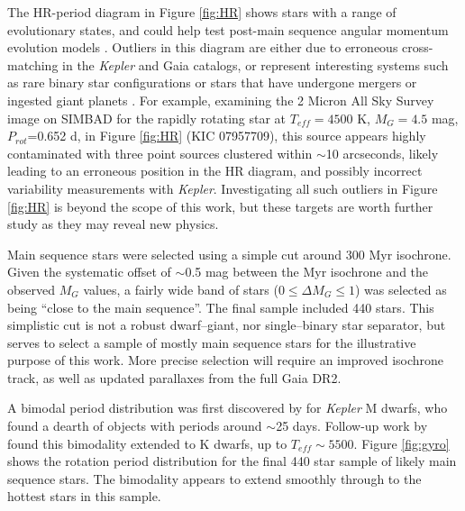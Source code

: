 \documentclass[manuscript, letterpaper]{aastex6}
\makeatletter
\let\origsection\section
\renewcommand\section{\@ifstar{\starsection}{\nostarsection}}
\newcommand\nostarsection[1]{\sectionprelude\origsection{#1}}
\newcommand\starsection[1]{\sectionprelude\origsection*{#1}}
\newcommand\sectionprelude{\vspace{1em}}
\newcommand{\Kepler}{\textsl{Kepler}\xspace}
\makeatother
\begin{document}
The HR-period diagram in Figure \ref{fig:HR} shows stars with a range of evolutionary states, and could help test post-main sequence angular momentum evolution models \citep[e.g.][]{donascimento2012}. Outliers in this diagram are either due to erroneous cross-matching in the \Kepler and Gaia catalogs, or represent interesting systems such as rare binary star configurations or stars that have undergone mergers or ingested giant planets \citep{massarotti2008,tayar2015}. For example, examining the 2 Micron All Sky Survey \citep[2MASS][]{2mass} image on SIMBAD for 
the rapidly rotating star at $T_{eff}=4500$ K, $M_G=4.5$ mag, $P_{rot}$=0.652 d, in Figure \ref{fig:HR} (KIC 07957709), this source appears highly contaminated with three point sources clustered within $\sim$10 arcseconds, likely leading to an erroneous position in the HR diagram, and possibly incorrect variability measurements with \Kepler.
Investigating all such outliers in Figure \ref{fig:HR} is beyond the scope of this work, but these targets are worth further study as they may reveal new physics.



Main sequence stars were selected using a simple cut around 300 Myr isochrone. Given the systematic offset of $\sim$0.5 mag between the Myr isochrone and the observed $M_G$ values, a fairly wide band of stars ($0\le \Delta M_G \le 1$) was selected as being ``close to the main sequence''. The final sample included 440 stars. This simplistic cut is not a robust dwarf--giant, nor single--binary star separator, but serves to select a sample of mostly main sequence stars for the illustrative purpose of this work. More precise selection will require an improved isochrone track, as well as updated parallaxes from the full Gaia DR2.







\section{Extending the Spin-Down Gap}
A bimodal period distribution was first discovered by \citet{mcquillan2013} for \Kepler M dwarfs, who found a dearth of objects with periods around $\sim$25 days. Follow-up work by \citet{mcquillan2014} found this bimodality extended to K dwarfs, up to $T_{eff}\sim5500$. Figure \ref{fig:gyro} shows the rotation period distribution for the final 440 star sample of likely main sequence stars. The bimodality appears to extend smoothly through to the hottest stars in this sample. 
\end{document}
